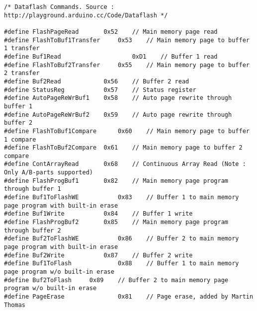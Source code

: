 \begin{lstlisting}[caption=dataflash.h,label=Code2]
/* Dataflash Commands. Source : http://playground.arduino.cc/Code/Dataflash */

#define FlashPageRead		0x52	// Main memory page read
#define FlashToBuf1Transfer   	0x53	// Main memory page to buffer 1 transfer
#define Buf1Read             		0xD1	// Buffer 1 read
#define FlashToBuf2Transfer 	0x55	// Main memory page to buffer 2 transfer
#define Buf2Read			0x56	// Buffer 2 read
#define StatusReg			0x57	// Status register
#define AutoPageReWrBuf1	0x58	// Auto page rewrite through buffer 1
#define AutoPageReWrBuf2	0x59	// Auto page rewrite through buffer 2
#define FlashToBuf1Compare      0x60	// Main memory page to buffer 1 compare
#define FlashToBuf2Compare	0x61	// Main memory page to buffer 2 compare
#define ContArrayRead		0x68	// Continuous Array Read (Note : Only A/B-parts supported)
#define FlashProgBuf1		0x82	// Main memory page program through buffer 1
#define Buf1ToFlashWE   		0x83	// Buffer 1 to main memory page program with built-in erase
#define Buf1Write			0x84	// Buffer 1 write
#define FlashProgBuf2		0x85	// Main memory page program through buffer 2
#define Buf2ToFlashWE   		0x86	// Buffer 2 to main memory page program with built-in erase
#define Buf2Write			0x87	// Buffer 2 write
#define Buf1ToFlash     		0x88	// Buffer 1 to main memory page program w/o built-in erase
#define Buf2ToFlash		0x89	// Buffer 2 to main memory page program w/o built-in erase
#define PageErase             	0x81	// Page erase, added by Martin Thomas

\end{lstlisting}
\pagebreak
